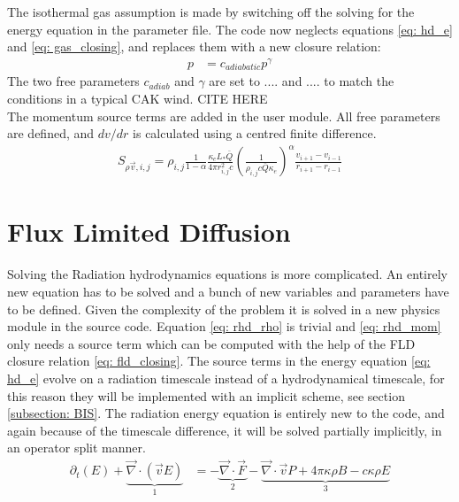 The isothermal gas assumption is made by switching off the solving for the energy equation in the parameter file. The code now neglects equations \eqref{eq: hd_e} and \eqref{eq: gas_closing}, and replaces them with a new closure relation:
\begin{align}
 p &= c_{adiabatic} p^\gamma
\end{align}
The two free parameters $c_{adiab}$ and $\gamma$ are set to .... and .... to match the conditions in a typical CAK wind. CITE HERE\\

The momentum source terms are added in the user module. All free parameters are defined, and $dv/dr$ is calculated using a centred finite difference.
\begin{align}
S_{\rho \vec{v},i,j} = \rho_{i,j} \frac{1}{1-\alpha} \frac{\kappa_e L_* \bar{Q}}{4\pi r_{i,j}^2 c} \left( \frac{1}{\rho_{i,j} c \bar{Q} \kappa_e} \right)^\alpha \frac{v_{i+1} - v_{i-1}}{r_{i+1} - r_{i-1}}
\end{align}


\section{Flux Limited Diffusion}
Solving the Radiation hydrodynamics equations is more complicated. An entirely new equation has to be solved and a bunch of new variables and parameters have to be defined. Given the complexity of the problem it is solved in a new physics module in the source code. Equation \eqref{eq: rhd_rho} is trivial and \eqref{eq: rhd_mom} only needs a source term which can be computed with the help of the FLD closure relation \eqref{eq: fld_closing}. The source terms in the energy equation \eqref{eq: hd_e} evolve on a radiation timescale instead of a hydrodynamical timescale, for this reason they will be implemented with an implicit scheme, see section \ref{subsection: BIS}. The radiation energy equation is entirely new to the code, and again because of the timescale difference, it will be solved partially implicitly, in an operator split manner. \\

\begin{align}
\partial_t \left(E \right) + \underbrace{\vec{\nabla} \cdot \left( \vec{v} E \right)}_{1}  &= - \underbrace{\vec{\nabla} \cdot \vec{F}}_{2} - \underbrace{\vec{\nabla} \cdot \vec{v} P + 4\pi \kappa\rho B - c \kappa \rho E}_{3} \\
\end{align} 

